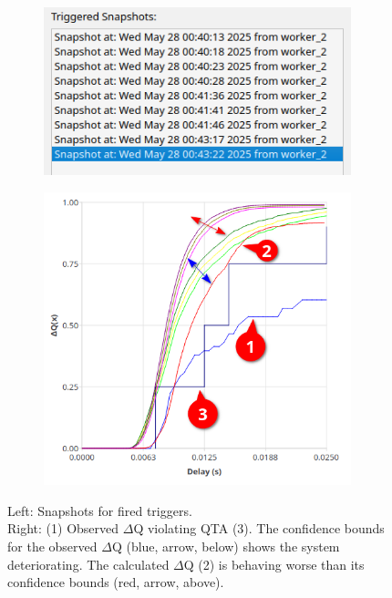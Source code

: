         \begin{figure}[H]
            \centering
            \begin{subfigure}{.5\textwidth}
                \centering
                \includegraphics[width=0.98\textwidth]{img/overload_2/snapshots.png}
                \label{fig:high_load_1}
            \end{subfigure}%
            \begin{subfigure}{.5\textwidth}
                \centering
                \includegraphics[width =0.98\textwidth]{img/overload_2/qta_triggerd2.png}
                \label{fig:high_load_2}
            \end{subfigure}
            \label{fig:early_ov}
            \caption{Left: Snapshots for fired triggers. \\
            Right: (1) Observed $\Delta$Q violating QTA (3). The confidence bounds for the observed $\Delta$Q (blue, arrow, below) shows the system deteriorating. The calculated $\Delta$Q (2) is behaving worse than its confidence bounds (red, arrow, above).} %
        \end{figure}

